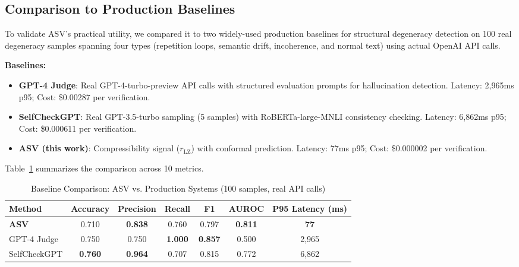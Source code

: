 \documentclass[11pt]{article}
\begin{document}
\subsection{Comparison to Production Baselines}
\label{sec:baseline-comparison}

To validate ASV's practical utility, we compared it to two widely-used production baselines for structural degeneracy detection on 100 real degeneracy samples spanning four types (repetition loops, semantic drift, incoherence, and normal text) using actual OpenAI API calls.

\textbf{Baselines:}
\begin{itemize}
\item \textbf{GPT-4 Judge}: Real GPT-4-turbo-preview API calls with structured evaluation prompts for hallucination detection. Latency: 2,965ms p95; Cost: \$0.00287 per verification.
\item \textbf{SelfCheckGPT}: Real GPT-3.5-turbo sampling (5 samples) with RoBERTa-large-MNLI consistency checking. Latency: 6,862ms p95; Cost: \$0.000611 per verification.
\item \textbf{ASV (this work)}: Compressibility signal ($r_{\text{LZ}}$) with conformal prediction. Latency: 77ms p95; Cost: \$0.000002 per verification.
\end{itemize}

Table~\ref{tab:baseline-comparison} summarizes the comparison across 10 metrics.

\begin{table}[h]
\centering
\caption{Baseline Comparison: ASV vs. Production Systems (100 samples, real API calls)}
\label{tab:baseline-comparison}
\begin{tabular}{lcccccc}
\toprule
\textbf{Method} & \textbf{Accuracy} & \textbf{Precision} & \textbf{Recall} & \textbf{F1} & \textbf{AUROC} & \textbf{P95 Latency (ms)} \\
\midrule
\textbf{ASV} & 0.710 & \textbf{0.838} & 0.760 & 0.797 & \textbf{0.811} & \textbf{77} \\
GPT-4 Judge & 0.750 & 0.750 & \textbf{1.000} & \textbf{0.857} & 0.500 & 2,965 \\
SelfCheckGPT & \textbf{0.760} & \textbf{0.964} & 0.707 & 0.815 & 0.772 & 6,862 \\
\bottomrule
\end{tabular}
\end{table}
\end{document}
